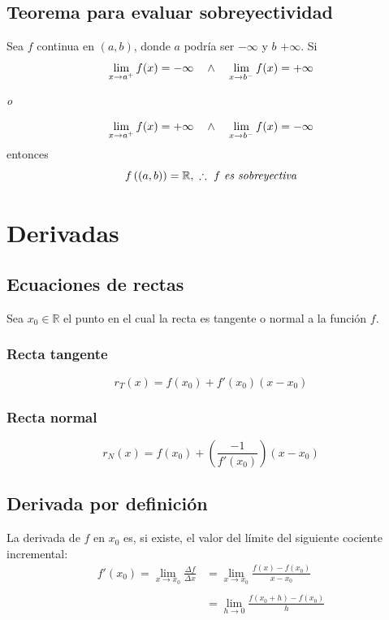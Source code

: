 \documentclass[11pt,titlepage]{article}
\newcommand{\commLim}[2]{\lim_{#1 \to #2}}
\newcommand{\displayLim}[2]{\displaystyle \commLim{#1}{#2}}
\begin{document}
\pagebreak

\subsection{Teorema para evaluar sobreyectividad}
Sea $f$ continua en $(a,b)$, donde $a$ podría ser $-\infty$ y $b$ $+\infty$. Si
\begin{equation*}
	\commLim{x}{a^{+}} f(x) = -\infty \quad \wedge \quad \displayLim{x}{b^{-}} f(x) = +\infty \\
\end{equation*}
\begin{center}
\Large{\emph{o}}
\end{center}
\begin{equation*}
	\commLim{x}{a^{+}} f(x) = +\infty \quad \wedge \quad \displayLim{x}{b^{-}} f(x) = -\infty \\
\end{equation*}
entonces
\begin{equation*}
	f\left((a,b)\right) = \mathbb{R}, \ \therefore \ f \ \text{\emph{es sobreyectiva}}
\end{equation*}

\vspace{1cm}
\section{Derivadas}

\subsection{Ecuaciones de rectas}
Sea $x_0 \in \mathbb{R}$ el punto en el cual la recta es tangente o normal a la función $f$.
\subsubsection{Recta tangente}
\begin{equation}
	r_{T}(x) = f(x_0) + f'(x_0)(x - x_0)
\end{equation}
\subsubsection{Recta normal}
\begin{equation}
	r_{N}(x) = f(x_0) + \left(\frac{-1}{f'(x_0)}\right)(x - x_0)
\end{equation}

\subsection{Derivada por definición}
La derivada de $f$ en $x_0$ es, si existe, el valor del límite del siguiente cociente incremental:
\begin{equation}
	\begin{aligned}
		f'(x_0) = \commLim{x}{x_0} \frac{\Delta f}{\Delta x} &= \commLim{x}{x_0} \frac{f(x) - f(x_0)}{x - x_0} \\ \\
		&= \commLim{h}{0} \frac{f(x_{0} + h) - f(x_0)}{h}
	\end{aligned}
\end{equation}
\end{document}
